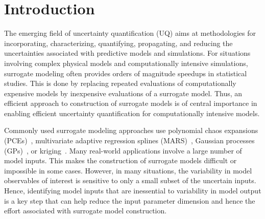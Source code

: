 \section{Introduction}
\label{sec:intro}


The emerging field of uncertainty quantification (UQ) aims at methodologies for
incorporating, characterizing, quantifying, propagating, and reducing the
uncertainties associated with predictive models and simulations.  For
situations involving complex physical models and computationally intensive
simulations, surrogate modeling often provides orders of magnitude speedups in
statistical studies. This is done by replacing repeated evaluations of
computationally expensive models by inexpensive evaluations of a surrogate
model.  Thus, an efficient approach to construction of surrogate models is of
central importance in enabling efficient uncertainty quantification for
computationally intensive models. 


Commonly used surrogate modeling approaches use polynomial chaos expansions
(PCEs)~\cite{Xiu:2002,Ghanem:2003,Olivier:2010}, multivariate adaptive
regression splines (MARS)~\cite{friedman93}, Gaussian processes
(GPs)~\cite{Rasmussen:2004}, or kriging~\cite{Stein:2012}.  Many real-world
applications involve a large number of model inputs. This makes
the construction of surrogate models difficult or impossible in some cases.
However, in many situations, the variability in model observables of interest
is sensitive to only a small subset of the uncertain inputs.  Hence,
identifying model inputs that are inessential to variability in model output is
a key step that can help reduce the input parameter dimension and hence the effort
associated with surrogate model construction. 


